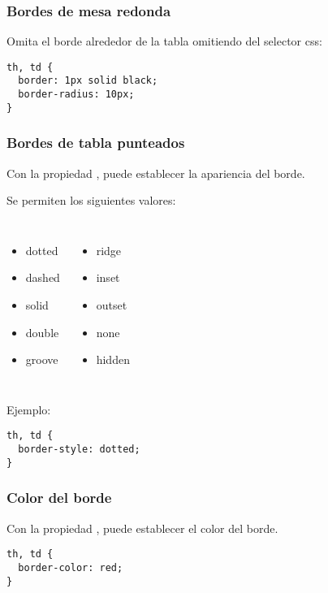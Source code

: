 \begin{frame}[fragile]
  \frametitle{Bordes de mesa redonda}

  Omita el borde alrededor de la tabla omitiendo 
  del selector css:

  \vspace{\baselineskip}
  \begin{lstlisting}
th, td {
  border: 1px solid black;
  border-radius: 10px;
}
  \end{lstlisting}
\end{frame}

\begin{frame}[fragile]
  \frametitle{Bordes de tabla punteados}
  Con la propiedad , puede establecer la
  apariencia del borde.

  \vspace{\baselineskip}
  Se permiten los siguientes valores:

  \begin{columns}
  \begin{itemize}
    \item dotted
    \item dashed
    \item solid
    \item double
    \item groove
  \end{itemize}
  \begin{itemize}
    \item ridge
    \item inset
    \item outset
    \item none
    \item hidden
  \end{itemize}
  \end{columns}

  \vspace{\baselineskip}
  Ejemplo:
  \begin{lstlisting}
th, td {
  border-style: dotted;
}
  \end{lstlisting}
\end{frame}

\begin{frame}[fragile]
  \frametitle{Color del borde}

  Con la propiedad , puede establecer el color del borde.

  \vspace{\baselineskip}
  \begin{lstlisting}
th, td {
  border-color: red;
}
  \end{lstlisting}
\end{frame}

